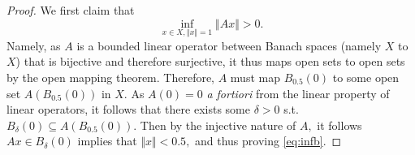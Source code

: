 \documentclass[10pt]{article}
\begin{document}
\begin{proof}
    We first claim that
    \begin{equation}\label{eq:infb}
        \inf_{x\in X,\Vert x\Vert=1}\Vert Ax\Vert >0.
    \end{equation}
    Namely, as $A$ is a bounded linear operator between Banach spaces (namely $X$ to $X$) that is bijective and therefore surjective, it thus maps open sets to open sets by the open mapping theorem. Therefore, $A$ must map $B_{0.5}(0)$ to some open set $A(B_{0.5}(0))$ in $X.$ As $A(0)=0$ \emph{a fortiori} from the linear property of linear operators, it follows that there exists some $\delta > 0$ s.t. $B_\delta(0)\subseteq A(B_{0.5}(0)).$ Then by the injective nature of $A,$ it follows $Ax \in B_\delta(0)$ implies that $\Vert x\Vert < 0.5,$ and thus proving \eqref{eq:infb}.


\end{proof}
\end{document}
